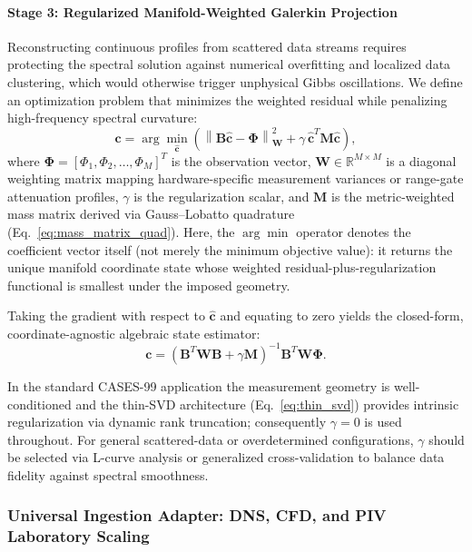 \documentclass[11pt,a4paper]{article}
\begin{document}
\paragraph{Stage 3: Regularized Manifold-Weighted Galerkin Projection}
Reconstructing continuous profiles from scattered data streams requires protecting the spectral solution against numerical overfitting and localized data clustering, which would otherwise trigger unphysical Gibbs oscillations. We define an optimization problem that minimizes the weighted residual while penalizing high-frequency spectral curvature:
\begin{equation}
\mathbf{c} = \arg\min_{\mathbf{\hat{c}}} \left( \left\| \mathbf{B}\mathbf{\hat{c}} - \mathbf{\Phi} \right\|_{\mathbf{W}}^2 + \gamma \, \mathbf{\hat{c}}^{T} \mathbf{M} \mathbf{\hat{c}} \right),
\label{eq:regularized_least_squares}
\end{equation}
where $\mathbf{\Phi} = [\Phi_1, \Phi_2, \dots, \Phi_M]^{T}$ is the observation vector, $\mathbf{W} \in \mathbb{R}^{M \times M}$ is a diagonal weighting matrix mapping hardware-specific measurement variances or range-gate attenuation profiles, $\gamma$ is the regularization scalar, and $\mathbf{M}$ is the metric-weighted mass matrix derived via Gauss--Lobatto quadrature (Eq.~\ref{eq:mass_matrix_quad}).
Here, the $\arg\min$ operator denotes the coefficient vector itself (not merely the minimum objective value): it returns the unique manifold coordinate state whose weighted residual-plus-regularization functional is smallest under the imposed geometry.

Taking the gradient with respect to $\mathbf{\hat{c}}$ and equating to zero yields the closed-form, coordinate-agnostic algebraic state estimator:
\begin{equation}
\mathbf{c} = \left( \mathbf{B}^{T} \mathbf{W} \mathbf{B} + \gamma \mathbf{M} \right)^{-1} \mathbf{B}^{T} \mathbf{W} \mathbf{\Phi}.
\label{eq:p_vt_closed_form}
\end{equation}

In the standard CASES-99 application the measurement geometry is well-conditioned and the thin-SVD architecture (Eq.~\ref{eq:thin_svd}) provides intrinsic regularization via dynamic rank truncation; consequently $\gamma = 0$ is used throughout. For general scattered-data or overdetermined configurations, $\gamma$ should be selected via L-curve analysis or generalized cross-validation to balance data fidelity against spectral smoothness.

\subsubsection{Universal Ingestion Adapter: DNS, CFD, and PIV Laboratory Scaling}
\label{sec:extensions:cfd_ingest}
\end{document}
